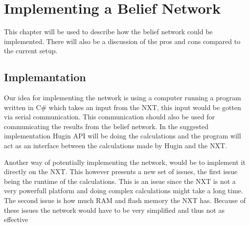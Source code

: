 \chapter{Implementing a Belief Network}
This chapter will be used to describe how the belief network could be
implemented. There will also be a discussion of the pros and cons compared to
the current setup. 

\section{Implemantation}
Our idea for implementing the network is using a computer running a program
written in C\# which takes an input from the NXT, this input would be gotten
via serial communication. This communication should also be used for
communicating the results from the belief network. In the suggested
implementation Hugin API will be doing the calculations and the program will act
as an interface between the calculations made by Hugin and the NXT. \nl

Another way of potentially implementing the network, would be to implement it
directly on the NXT. This however presents a new set of issues, the first
issue being the runtime of the calculations. This is an issue since the NXT is
not a very powerfull platform and doing complex calculations might take a long
time. The second issue is how much RAM and flash memory the NXT has. Because of these
issues the network would have to be very simplified and thus not as effective 
